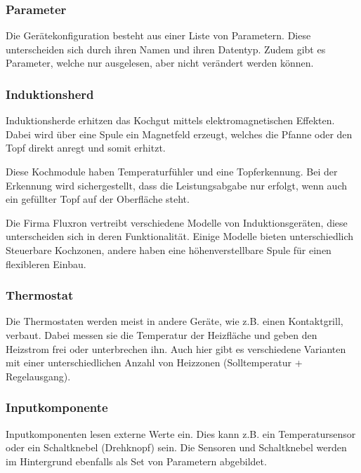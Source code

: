 \subsubsection{Parameter}
\label{subsubsec:Parameter}
Die Gerätekonfiguration besteht aus einer Liste von Parametern. Diese unterscheiden sich durch ihren Namen und ihren Datentyp. Zudem gibt es Parameter, welche nur ausgelesen, aber nicht verändert werden können.

\subsubsection{Induktionsherd}
\label{subsubsec:Induktionsherd}
Induktionsherde erhitzen das Kochgut mittels elektromagnetischen Effekten. Dabei wird über eine Spule ein Magnetfeld erzeugt, welches die Pfanne oder den Topf direkt anregt und somit erhitzt.

Diese Kochmodule haben Temperaturfühler und eine Topferkennung. Bei der Erkennung wird sichergestellt, dass die Leistungsabgabe nur erfolgt, wenn auch ein gefüllter Topf auf der Oberfläche steht.

Die Firma Fluxron vertreibt verschiedene Modelle von Induktionsgeräten, diese unterscheiden sich in deren Funktionalität. Einige Modelle bieten unterschiedlich Steuerbare Kochzonen, andere haben eine höhenverstellbare Spule für einen flexibleren Einbau.

\subsubsection{Thermostat}
\label{subsubsec:Thermostat}

Die Thermostaten werden meist in andere Geräte, wie z.B. einen Kontaktgrill, verbaut. Dabei messen sie die Temperatur der Heizfläche und geben den Heizstrom frei oder unterbrechen ihn. Auch hier gibt es verschiedene Varianten mit einer unterschiedlichen Anzahl von Heizzonen (Solltemperatur + Regelausgang).

\subsubsection{Inputkomponente}
\label{subsubsec:Inputkomponente}

Inputkomponenten lesen externe Werte ein. Dies kann z.B. ein Temperatursensor oder ein Schaltknebel (Drehknopf) sein. Die Sensoren und Schaltknebel werden im Hintergrund ebenfalls als Set von Parametern abgebildet.